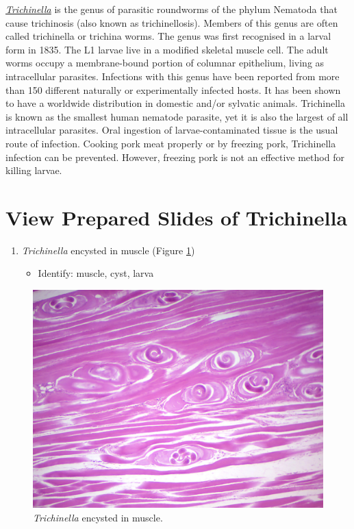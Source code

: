 \href{https://en.wikipedia.org/wiki/Trichinella}{\emph{Trichinella}} is
the genus of parasitic roundworms of the phylum Nematoda that cause
trichinosis (also known as trichinellosis). Members of this genus are
often called trichinella or trichina worms. The genus was first
recognised in a larval form in 1835. The L1 larvae live in a modified
skeletal muscle cell. The adult worms occupy a membrane-bound portion of
columnar epithelium, living as intracellular parasites. Infections with
this genus have been reported from more than 150 different naturally or
experimentally infected hosts. It has been shown to have a worldwide
distribution in domestic and/or sylvatic animals. Trichinella is known
as the smallest human nematode parasite, yet it is also the largest of
all intracellular parasites. Oral ingestion of larvae-contaminated
tissue is the usual route of infection. Cooking pork meat properly or by
freezing pork, Trichinella infection can be prevented. However, freezing
pork is not an effective method for killing larvae.

\section{View Prepared Slides of
Trichinella}\label{view-prepared-slides-of-trichinella}

\begin{enumerate}
\def\labelenumi{\arabic{enumi}.}
\tightlist
\item
  \emph{Trichinella} encysted in muscle (Figure \ref{fig:trichinella})

  \begin{itemize}
  \tightlist
  \item
    Identify: muscle, cyst, larva
  \end{itemize}
\end{enumerate}



\begin{figure}

{\centering \includegraphics[width=0.7\linewidth]{./figures/nematoda/trichinella_encysted}

}

\caption{\emph{Trichinella} encysted in muscle.}\label{fig:trichinella}
\end{figure}

